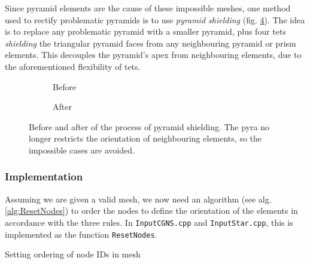 {\begin{figure}[h!]
  \centering
  
  \caption{}
  \label{fig:pyra_impossible}
\end{figure}

Since pyramid elements are the cause of these impossible meshes, one method used to rectify problematic pyramids is to use \textit{pyramid shielding} (fig. \ref{fig:pyramid_shielding}). The idea is to replace any problematic pyramid with a smaller pyramid, plus four tets \textit{shielding} the triangular pyramid faces from any neighbouring pyramid or prism elements. This decouples the pyramid's apex from neighbouring elements, due to the aforementioned flexibility of tets.

\begin{figure}[h!]
    \centering
    \begin{subfigure}[b]{0.45\textwidth}
        \centering
        
        \caption{Before}
        \label{fig:pyramid_shielding-before}
    \end{subfigure}
    \hfill
    \begin{subfigure}[b]{0.45\textwidth}
        \centering
        \raisebox{-5mm}{ %
            
        }
        \caption{After}
        \label{fig:pyramid_shielding-after}
    \end{subfigure}
    \caption{Before and after of the process of pyramid shielding. The pyra no longer restricts the orientation of neighbouring elements, so the impossible cases are avoided.}
    \label{fig:pyramid_shielding}
\end{figure}

\subsubsection{Implementation}
Assuming we are given a valid mesh, we now need an algorithm (see alg. \ref{alg:ResetNodes}) to order the nodes to define the orientation of the elements in accordance with the three rules. In \texttt{InputCGNS.cpp} and \texttt{InputStar.cpp}, this is implemented as the function \texttt{ResetNodes}.\\

\begin{algorithm}[hbt!]
\caption{Setting ordering of node IDs in mesh}
\label{alg:ResetNodes}
    
\end{algorithm}

}
